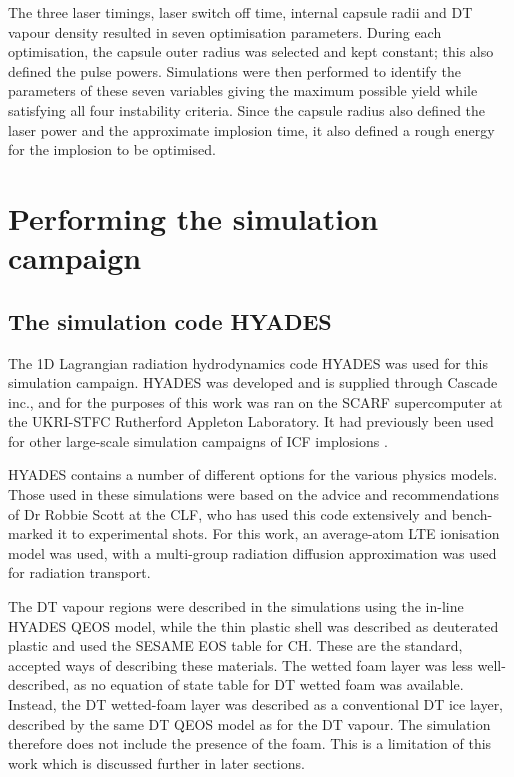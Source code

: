 The three laser timings, laser switch off time, internal capsule radii and DT vapour density resulted in seven optimisation parameters. During each optimisation, the capsule outer radius was selected and kept constant; this also defined the pulse powers. Simulations were then performed to identify the parameters of these seven variables giving the maximum possible yield while satisfying all four instability criteria. Since the capsule radius also defined the laser power and the approximate implosion time, it also defined a rough energy for the implosion to be optimised.


\section{Performing the simulation campaign}

\subsection{The simulation code HYADES}

The 1D Lagrangian radiation hydrodynamics code HYADES was used for this simulation campaign.  HYADES was developed and is supplied through Cascade inc., and for the purposes of this work was ran on the SCARF supercomputer at the UKRI-STFC Rutherford Appleton Laboratory. It had previously been used for other large-scale simulation campaigns of ICF implosions \cite{Hatfield2019}. 

HYADES contains a number of different options for the various physics models. Those used in these simulations were based on the advice and recommendations of Dr Robbie Scott at the CLF, who has used this code extensively and bench-marked it to experimental shots. For this work, an average-atom LTE ionisation model was used, with a multi-group radiation diffusion approximation was used for radiation transport. 

The DT vapour regions were described in the simulations using the in-line HYADES QEOS model, while the thin plastic shell was described as deuterated plastic and used the SESAME EOS table for CH. These are the standard, accepted ways of describing these materials. The wetted foam layer was less well-described, as no equation of state table for DT wetted foam was available. Instead, the DT wetted-foam layer was described as a conventional DT ice layer, described by the same DT QEOS model as for the DT vapour. The simulation therefore does not include the presence of the foam. This is a limitation of this work which is discussed further in later sections.

